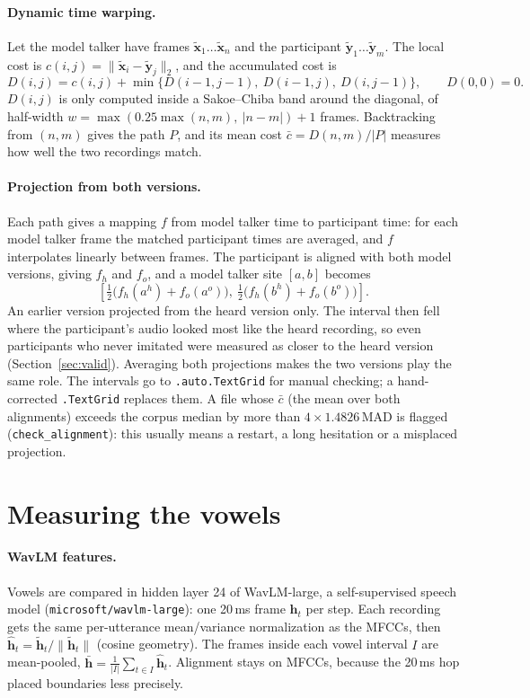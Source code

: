 \documentclass[11pt]{article}
\begin{document}
\paragraph{Dynamic time warping.} Let the model talker have frames $\tilde{\mathbf{x}}_1\ldots\tilde{\mathbf{x}}_n$ and the participant $\tilde{\mathbf{y}}_1\ldots\tilde{\mathbf{y}}_m$. The local cost is $c(i,j) = \lVert\tilde{\mathbf{x}}_i - \tilde{\mathbf{y}}_j\rVert_2$, and the accumulated cost is
\[
D(i,j) = c(i,j) + \min\{D(i-1,j-1),\ D(i-1,j),\ D(i,j-1)\}, \qquad D(0,0)=0.
\]
$D(i,j)$ is only computed inside a Sakoe--Chiba band around the diagonal, of half-width $w = \max(0.25\max(n,m),\ |n-m|)+1$ frames. Backtracking from $(n,m)$ gives the path $P$, and its mean cost $\bar c = D(n,m)/|P|$ measures how well the two recordings match.

\paragraph{Projection from both versions.} Each path gives a mapping $f$ from model talker time to participant time: for each model talker frame the matched participant times are averaged, and $f$ interpolates linearly between frames. The participant is aligned with both model versions, giving $f_h$ and $f_o$, and a model talker site $[a,b]$ becomes
\[
\left[\tfrac12\bigl(f_h(a^h) + f_o(a^o)\bigr),\ \tfrac12\bigl(f_h(b^h) + f_o(b^o)\bigr)\right].
\]
An earlier version projected from the heard version only. The interval then fell where the participant's audio looked most like the heard recording, so even participants who never imitated were measured as closer to the heard version (Section~\ref{sec:valid}). Averaging both projections makes the two versions play the same role. The intervals go to \texttt{.auto.TextGrid} for manual checking; a hand-corrected \texttt{.TextGrid} replaces them. A file whose $\bar c$ (the mean over both alignments) exceeds the corpus median by more than $4\times1.4826\,\mathrm{MAD}$ is flagged (\texttt{check\_alignment}): this usually means a restart, a long hesitation or a misplaced projection.

\section{Measuring the vowels}

\paragraph{WavLM features.} Vowels are compared in hidden layer 24 of WavLM-large, a self-supervised speech model (\texttt{microsoft/wavlm-large}): one 20\,ms frame $\mathbf{h}_t$ per step. Each recording gets the same per-utterance mean/variance normalization as the MFCCs, then $\hat{\mathbf{h}}_t = \tilde{\mathbf{h}}_t/\lVert\tilde{\mathbf{h}}_t\rVert$ (cosine geometry). The frames inside each vowel interval $I$ are mean-pooled, $\bar{\mathbf{h}} = \frac{1}{|I|}\sum_{t\in I}\hat{\mathbf{h}}_t$. Alignment stays on MFCCs, because the 20\,ms hop placed boundaries less precisely.
\end{document}
